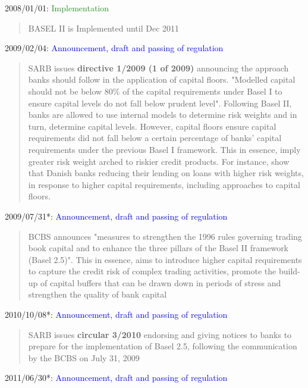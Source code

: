 \documentclass[
  letterpaper,
  DIV=11,
  numbers=noendperiod]{scrartcl}
\begin{document}
2008/01/01: \textcolor{ForestGreen}{Implementation}

\begin{quote}
            BASEL II is  Implemented until Dec 2011

\end{quote}

2009/02/04:
\textcolor{blue}{Announcement, draft and passing of regulation}

\begin{quote}
SARB issues  \textbf{directive 1/2009 (1 of 2009)} announcing the approach banks should follow in the application of capital floors. "Modelled capital should not be below 80\% of the capital requirements under Basel I to ensure capital levels do not fall below prudent level". Following Basel II, banks are allowed to use internal models to determine risk weights and in turn, determine capital levels. However, capital floors ensure capital requirements did not fall below a certain percentage of banks’ capital requirements under the previous Basel I framework\citep{basel06}. This in essence, imply greater risk weight arched to riskier credit products. For instance,  \cite{imbierowicz2018time} show that Danish banks reducing their lending on loans with higher risk weights, in response to higher capital requirements, including approaches to capital floors.
\end{quote}

2009/07/31*:
\textcolor{blue}{Announcement, draft and passing of regulation}

\begin{quote}BCBS announces "measures to strengthen the 1996 rules governing trading book capital and to enhance the three pillars of the Basel II framework (Basel 2.5)". This in essence, aims  to introduce higher capital requirements to capture the credit risk of complex trading activities, promote the build-up of capital buffers that can be drawn down in periods of stress and strengthen the quality of bank capital\citep{basel09}
\end{quote}

2010/10/08*:
\textcolor{blue}{Announcement, draft and passing of regulation}

\begin{quote}SARB issues \textbf{circular 3/2010} endorsing and giving notices to banks to prepare for the implementation of Basel 2.5, following the communication by the BCBS on July 31, 2009
\end{quote}

2011/06/30*:
\textcolor{blue}{Announcement, draft and passing of regulation}
\end{document}
